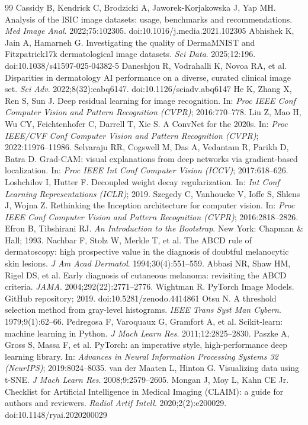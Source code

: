 \documentclass[11pt,a4paper]{article}
\begin{document}
\begin{thebibliography}{99}
 Cassidy B, Kendrick C, Brodzicki A, Jaworek-Korjakowska J, Yap MH. Analysis of the ISIC image datasets: usage, benchmarks and recommendations. \emph{Med Image Anal}. 2022;75:102305. doi:10.1016/j.media.2021.102305
 Abhishek K, Jain A, Hamarneh G. Investigating the quality of DermaMNIST and Fitzpatrick17k dermatological image datasets. \emph{Sci Data}. 2025;12:196. doi:10.1038/s41597-025-04382-5
 Daneshjou R, Vodrahalli K, Novoa RA, et al. Disparities in dermatology AI performance on a diverse, curated clinical image set. \emph{Sci Adv}. 2022;8(32):eabq6147. doi:10.1126/sciadv.abq6147
 He K, Zhang X, Ren S, Sun J. Deep residual learning for image recognition. In: \emph{Proc IEEE Conf Computer Vision and Pattern Recognition (CVPR)}; 2016:770--778.
 Liu Z, Mao H, Wu CY, Feichtenhofer C, Darrell T, Xie S. A ConvNet for the 2020s. In: \emph{Proc IEEE/CVF Conf Computer Vision and Pattern Recognition (CVPR)}; 2022:11976--11986.
 Selvaraju RR, Cogswell M, Das A, Vedantam R, Parikh D, Batra D. Grad-CAM: visual explanations from deep networks via gradient-based localization. In: \emph{Proc IEEE Int Conf Computer Vision (ICCV)}; 2017:618--626.
 Loshchilov I, Hutter F. Decoupled weight decay regularization. In: \emph{Int Conf Learning Representations (ICLR)}; 2019.
 Szegedy C, Vanhoucke V, Ioffe S, Shlens J, Wojna Z. Rethinking the Inception architecture for computer vision. In: \emph{Proc IEEE Conf Computer Vision and Pattern Recognition (CVPR)}; 2016:2818--2826.
 Efron B, Tibshirani RJ. \emph{An Introduction to the Bootstrap}. New York: Chapman \& Hall; 1993.
 Nachbar F, Stolz W, Merkle T, et al. The ABCD rule of dermatoscopy: high prospective value in the diagnosis of doubtful melanocytic skin lesions. \emph{J Am Acad Dermatol}. 1994;30(4):551--559.
 Abbasi NR, Shaw HM, Rigel DS, et al. Early diagnosis of cutaneous melanoma: revisiting the ABCD criteria. \emph{JAMA}. 2004;292(22):2771--2776.
 Wightman R. PyTorch Image Models. GitHub repository; 2019. doi:10.5281/zenodo.4414861
 Otsu N. A threshold selection method from gray-level histograms. \emph{IEEE Trans Syst Man Cybern}. 1979;9(1):62--66.
 Pedregosa F, Varoquaux G, Gramfort A, et al. Scikit-learn: machine learning in Python. \emph{J Mach Learn Res}. 2011;12:2825--2830.
 Paszke A, Gross S, Massa F, et al. PyTorch: an imperative style, high-performance deep learning library. In: \emph{Advances in Neural Information Processing Systems 32 (NeurIPS)}; 2019:8024--8035.
 van der Maaten L, Hinton G. Visualizing data using t-SNE. \emph{J Mach Learn Res}. 2008;9:2579--2605.
 Mongan J, Moy L, Kahn CE Jr. Checklist for Artificial Intelligence in Medical Imaging (CLAIM): a guide for authors and reviewers. \emph{Radiol Artif Intell}. 2020;2(2):e200029. doi:10.1148/ryai.2020200029
\end{thebibliography}
\end{document}
